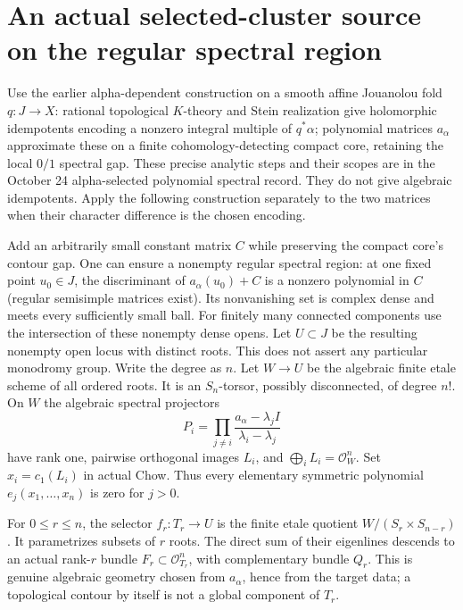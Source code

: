 \documentclass[11pt]{article}
\begin{document}
\section{An actual selected-cluster source on the regular spectral region}
Use the earlier alpha-dependent construction on a smooth affine Jouanolou
fold $q:J\to X$: rational topological $K$-theory and Stein realization give
holomorphic idempotents encoding a nonzero integral multiple of $q^*\alpha$;
polynomial matrices $a_\alpha$ approximate these on a finite
cohomology-detecting compact core, retaining the local $0/1$ spectral gap.
These precise analytic steps and their scopes are in the October 24
alpha-selected polynomial spectral record. They do not give algebraic
idempotents. Apply the following construction separately to the two matrices
when their character difference is the chosen encoding.

Add an arbitrarily small constant matrix $C$ while preserving the compact
core's contour gap. One can ensure a nonempty regular spectral region:
at one fixed point $u_0\in J$, the discriminant of $a_\alpha(u_0)+C$ is a
nonzero polynomial in $C$ (regular semisimple matrices exist). Its nonvanishing
set is complex dense and meets every sufficiently small ball. For finitely
many connected components use the intersection of these nonempty dense opens.
Let $U\subset J$ be the resulting nonempty open locus with distinct roots.
This does not assert any particular monodromy group. Write the degree as $n$.
Let $W\to U$ be the algebraic finite etale scheme of all ordered roots.
It is an $S_n$-torsor, possibly disconnected, of degree $n!$.
On $W$ the algebraic spectral projectors
\[
 P_i=\prod_{j\ne i}\frac{a_\alpha-\lambda_j I}{\lambda_i-\lambda_j}
\]
have rank one, pairwise orthogonal images $L_i$, and
$\bigoplus_iL_i=\mathcal O_W^n$. Set $x_i=c_1(L_i)$ in actual Chow.
Thus every elementary symmetric polynomial $e_j(x_1,\ldots,x_n)$ is zero
for $j>0$.

For $0\leq r\leq n$, the selector $f_r:T_r\to U$ is the finite etale
quotient $W/(S_r\times S_{n-r})$. It parametrizes subsets of $r$ roots.
The direct sum of their eigenlines descends to an actual rank-$r$ bundle
$F_r\subset\mathcal O_{T_r}^n$, with complementary bundle $Q_r$.
This is genuine algebraic geometry chosen from $a_\alpha$, hence from
the target data; a topological contour by itself is not a global component
of $T_r$.
\end{document}
